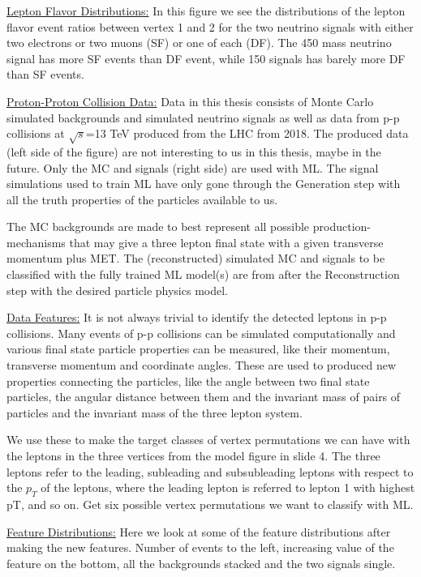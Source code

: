 \documentclass[a4paper, american, 12pt]{report}
\begin{document}
	\underline{Lepton Flavor Distributions:}
	In this figure we see the distributions of the lepton flavor event ratios between vertex 1 and 2 for the two neutrino signals with either two electrons or two muons (SF) or one of each (DF). The 450 mass neutrino signal has more SF events than DF event, while 150 signals has barely more DF than SF events.
	
	
	\underline{Proton-Proton Collision Data:}
	Data in this thesis consists of Monte Carlo simulated backgrounds and simulated neutrino signals as well as data from p-p collisions at $\sqrt{s}$=13 TeV produced from the LHC from 2018. The produced data (left side of the figure) are not interesting to us in this thesis, maybe in the future. Only the MC and signals (right side) are used with ML. The signal simulations used to train ML have only gone through the Generation step with all the truth properties of the particles available to us. 
	
	The MC backgrounds are made to best represent all possible production-mechanisms that may give a three lepton final state with a given transverse momentum plus MET. The (reconstructed) simulated MC and signals to be classified with the fully trained ML model(s) are from after the Reconstruction step with the desired particle physics model.
	
	
	\underline{Data Features:}
	It is not always trivial to identify the detected leptons in p-p collisions. Many events of p-p collisions can be simulated computationally and various final state particle properties can be measured, like their momentum, transverse momentum and coordinate angles. These are used to produced new properties connecting the particles, like the angle between two final state particles, the angular distance between them and the invariant mass of pairs of particles and the invariant mass of the three lepton system.
	
	We use these to make the target classes of vertex permutations we can have with the leptons in the three vertices from the model figure in slide 4. The three leptons refer to the leading, subleading and subsubleading leptons with respect to the $p_T$ of the leptons, where the leading lepton is referred to lepton 1 with highest pT, and so on. Get six possible vertex permutations we want to classify with ML.
	
	
	\underline{Feature Distributions:}
	Here we look at some of the feature distributions after making the new features. Number of events to the left, increasing value of the feature on the bottom, all the backgrounds stacked and the two signals single.
	
\end{document}
